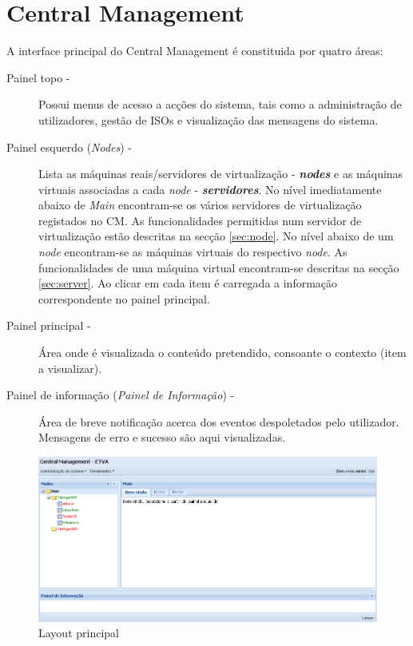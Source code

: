 
\chapter{\textsf{Central Management}}

A interface principal do Central Management é constituida por quatro áreas:

\begin{description}
	\item[Painel topo -] Possui menus de acesso a acções do sistema, tais como a administração de utilizadores, gestão de ISOs e visualização das mensagens do sistema.
	\item[Painel esquerdo (\emph{Nodes}) -] Lista as máquinas reais/servidores de virtualização - {\bf\emph{nodes}} e as máquinas virtuais associadas a cada \emph{node} - {\bf\emph{servidores}}. No nível imediatamente abaixo de \emph{Main} encontram-se os vários servidores de virtualização registados no CM. As funcionalidades permitidas num servidor de virtualização estão descritas na secção \ref{sec:node}. No nível abaixo de um \emph{node} encontram-se as máquinas virtuais do respectivo \emph{node}. As funcionalidades de uma máquina virtual encontram-se descritas na secção \ref{sec:server}. Ao clicar em cada item é carregada a informação correspondente no painel principal.
	\item[Painel principal -] Área onde é visualizada o conteúdo pretendido, consoante o contexto (item a visualizar).
	\item[Painel de informação (\emph{Painel de Informação}) -] Área de breve notificação acerca dos eventos despoletados pelo utilizador. Mensagens de erro e sucesso são aqui visualizadas.
\end{description}

\begin{figure}[H]
	\begin{center}
	\includegraphics[scale=0.45]{screenshots/principal.png}
	\caption{Layout principal}
	\label{fig:principal}
	\end{center}
\end{figure}

